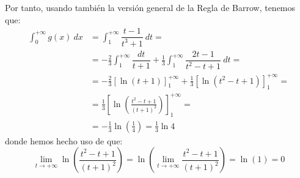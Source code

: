 \begin{ejercicio}
    Por tanto, usando también la versión general de la Regla de Barrow, tenemos que:
    \begin{align*}
        \int_0^{+\infty} g(x)~dx &= \int_1^{+\infty} \dfrac{t-1}{t^3+1}~dt
        =\\&= -\frac{2}{3}\int_1^{+\infty} \dfrac{dt}{t+1} + \frac{1}{3}\int_1^{+\infty} \dfrac{2t-1}{t^2-t+1}~dt
        =\\&= -\frac{2}{3}\left[\ln(t+1)\right]_1^{+\infty} + \frac{1}{3}\left[\ln(t^2-t+1)\right]_1^{+\infty}
        =\\&= \frac{1}{3}\left[\ln\left(\frac{t^2-t+1}{(t+1)^2}\right)\right]_1^{+\infty}
        =\\&= -\frac{1}{3}\ln\left(\frac{1}{4}\right)
        = \frac{1}{3}\ln 4
    \end{align*}
    donde hemos hecho uso de que:
    \begin{equation*}
        \lim_{t\to+\infty}\ln\left(\frac{t^2-t+1}{(t+1)^2}\right) =
        \ln\left(\lim_{t\to+\infty}\frac{t^2-t+1}{(t+1)^2}\right) =
        \ln(1) = 0
    \end{equation*}
\end{ejercicio}


